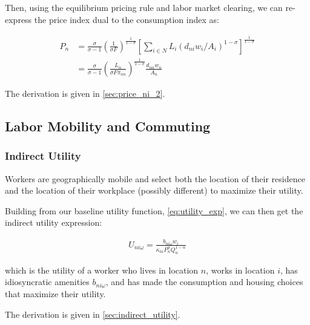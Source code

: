 \documentclass[10pt]{article}
\begin{document}
Then, using the equilibrium pricing rule
and labor market clearing, we can 
re-express the price index dual to the consumption index as:

\begin{align}
    P_n & =\frac{\sigma}{\sigma-1}\left(\frac{1}{\sigma F}\right)^{\frac{1}{1-\sigma}}\left[\sum_{i \in N} L_i\left(d_{n i} w_i / A_i\right)^{1-\sigma}\right]^{\frac{1}{1-\sigma}} \\
    & =\frac{\sigma}{\sigma-1}\left(\frac{L_n}{\sigma F \pi_{n n}}\right)^{\frac{1}{1-\sigma}} \frac{d_{n n} w_n}{A_n} \label{eq:price_index_p_n_2}
\end{align}

The derivation is given in \autoref{sec:price_ni_2}.


\subsection{Labor Mobility and Commuting}

\subsubsection{Indirect Utility}

Workers are geographically mobile and select 
both the location of their residence and the location of 
their workplace (possibly different) to maximize their 
utility. 

Building from our baseline utility function,
\eqref{eq:utility_exp}, we can 
then get the indirect utility expression:

\begin{align}
    U_{n i \omega}=\frac{b_{n i \omega} w_i}{\kappa_{n i} P_n^\alpha Q_n^{1-\alpha}} \label{eq:indirect_utility}
\end{align}

which is the utility of a worker who lives in location $n$,
works in location $i$, has idiosyncratic amenities $b_{n i \omega}$,
and has made the consumption and housing choices that
maximize their utility.

The derivation is given in \autoref{sec:indirect_utility}.

\end{document}
